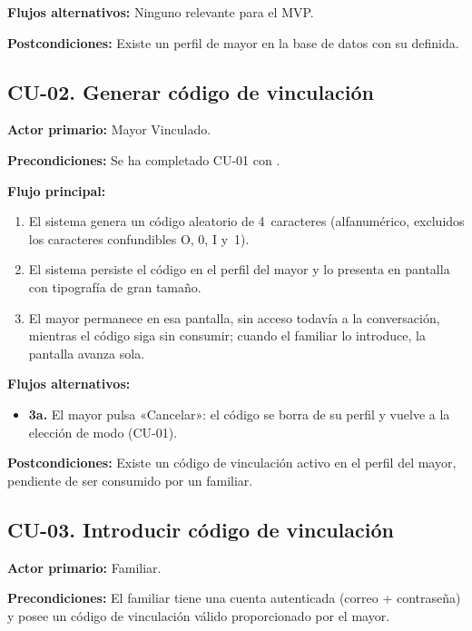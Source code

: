 \noindent\textbf{Flujos alternativos:} Ninguno relevante para el MVP.

\noindent\textbf{Postcondiciones:} Existe un perfil de mayor en la base de datos con su 
definida.

\bigskip

\subsection*{CU-02. Generar código de vinculación}

\noindent\textbf{Actor primario:} Mayor Vinculado.

\noindent\textbf{Precondiciones:} Se ha completado CU-01 con .

\noindent\textbf{Flujo principal:}
\begin{enumerate}[nosep]
    \item El sistema genera un código aleatorio de 4~caracteres (alfanumérico, excluidos los caracteres
    confundibles O, 0, I y~1).
    \item El sistema persiste el código en el perfil del mayor y lo presenta en pantalla con tipografía de
    gran tamaño.
    \item El mayor permanece en esa pantalla, sin acceso todavía a la conversación, mientras el código
    siga sin consumir; cuando el familiar lo introduce, la pantalla avanza sola.
\end{enumerate}

\noindent\textbf{Flujos alternativos:}
\begin{itemize}[nosep]
    \item \textbf{3a.} El mayor pulsa «Cancelar»: el código se borra de su perfil y vuelve a la elección de
    modo (CU-01).
\end{itemize}

\noindent\textbf{Postcondiciones:} Existe un código de vinculación activo en el perfil del mayor,
pendiente de ser consumido por un familiar.

\bigskip

\subsection*{CU-03. Introducir código de vinculación}

\noindent\textbf{Actor primario:} Familiar.

\noindent\textbf{Precondiciones:} El familiar tiene una cuenta autenticada (correo + contraseña) y
posee un código de vinculación válido proporcionado por el mayor.

